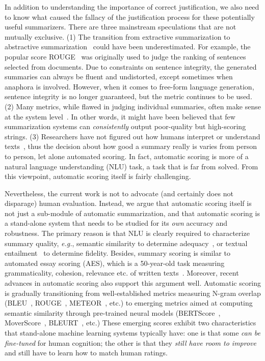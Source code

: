 \documentclass[11pt]{article}
\theoremstyle{remark}
\begin{document}
In addition to understanding the importance of correct justification, we also need to know what caused the fallacy of the justification process for these potentially useful summarizers. There are three mainstream speculations that are not mutually exclusive. (1) The transition from extractive summarization to abstractive summarization~\cite{kryscinski-etal-2019-neural} could have been underestimated. For example, the popular score ROUGE~\cite{lin-2004-rouge} was originally used to judge the ranking of sentences selected from documents. Due to constraints on sentence integrity, the generated summaries can always be fluent and undistorted, except sometimes when anaphora is involved. However, when it comes to free-form language generation, sentence integrity is no longer guaranteed, but the metric continues to be used. (2) Many metrics, while flawed in judging individual summaries, often make sense at the system level~\cite{reiter-2018-structured,gehrmann-etal-2021-gem,bohm-etal-2019-better}. In other words, it might have been believed that few summarization systems can \emph{consistently} output poor-quality but high-scoring strings. (3) Researchers have not figured out how humans interpret or understand texts~\cite{van2021human,gehrmann-etal-2021-gem,schluter-2017-limits}, thus the decision about how good a summary really is varies from person to person, let alone automated scoring. In fact, automatic scoring is more of a natural language understanding (NLU) task, a task that is far from solved. From this viewpoint, automatic scoring itself is fairly challenging.

Nevertheless, the current work is not to advocate (and certainly does not disparage) human evaluation. Instead, we argue that automatic scoring itself is not just a sub-module of automatic summarization, and that automatic scoring is a stand-alone system that needs to be studied for its \emph{own} accuracy and robustness. The primary reason is that NLU is clearly required to characterize summary quality, \emph{e.g.}, semantic similarity to determine adequacy~\cite{morris-2020-second}, or textual entailment~\cite{dagan2005pascal} to determine fidelity. Besides, summary scoring is similar to automated essay scoring (AES), which is a 50-year-old task measuring grammaticality, cohesion, relevance etc. of written texts~\cite{ke2019automated}. Moreover, recent advances in automatic scoring also support this argument well. Automatic scoring is gradually transitioning from well-established metrics measuring N-gram overlap (BLEU~\cite{papineni-etal-2002-bleu}, ROUGE~\cite{lin-2004-rouge}, METEOR~\cite{banerjee-lavie-2005-meteor}, etc.) to emerging metrics aimed at computing semantic similarity through pre-trained neural models (BERTScore~\cite{zhang2019bertscore}, MoverScore~\cite{zhao-etal-2019-moverscore}, BLEURT~\cite{sellam-etal-2020-bleurt}, etc.) These emerging scores exhibit two characteristics that stand-alone machine learning systems typically have: one is that some \emph{can be fine-tuned} for human cognition; the other is that they \emph{still have room to improve} and still have to learn how to match human ratings. 
\end{document}
